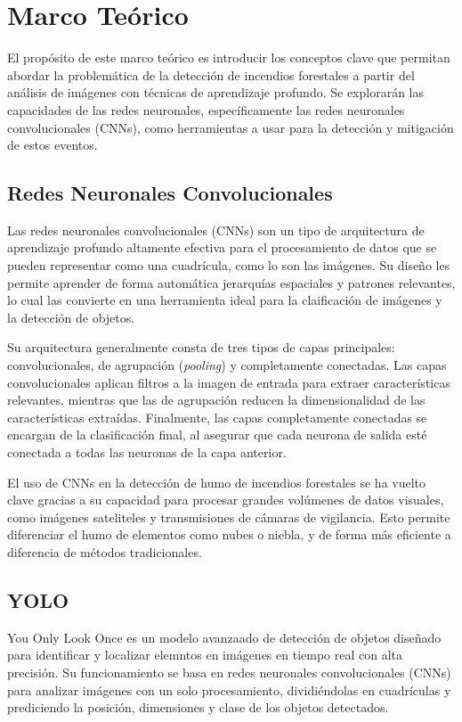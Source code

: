 \section{Marco Teórico}
El propósito de este marco teórico es introducir los conceptos clave que permitan abordar
la problemática de la detección de incendios forestales a partir del análisis de imágenes
con técnicas de aprendizaje profundo. Se explorarán las capacidades de las redes neuronales,
específicamente las redes neuronales convolucionales (CNNs), como herramientas a usar
para la detección y mitigación de estos eventos.

\subsection{Redes Neuronales Convolucionales}
Las redes neuronales convolucionales (CNNs) son un tipo de arquitectura de aprendizaje
profundo altamente efectiva para el procesamiento de datos que se pueden representar
como una cuadrícula, como lo son las imágenes. Su diseño les permite aprender de forma
automática jerarquías espaciales y patrones relevantes, lo cual las convierte en una
herramienta ideal para la claificación de imágenes y la detección de objetos.

Su arquitectura generalmente consta de tres tipos de capas principales: convolucionales,
de agrupación (\textit{pooling}) y completamente conectadas. Las capas convolucionales
aplican filtros a la imagen de entrada para extraer características relevantes, mientras
que las de agrupación reducen la dimensionalidad de las características extraídas.
Finalmente, las capas completamente conectadas se encargan de la clasificación final,
al asegurar que cada neurona de salida esté conectada a todas las neuronas de la capa
anterior.

El uso de CNNs en la detección de humo de incendios forestales se ha vuelto clave gracias
a su capacidad para procesar grandes volúmenes de datos visuales, como imágenes sateliteles
y transmisiones de cámaras de vigilancia. Esto permite diferenciar el humo de elementos
como nubes o niebla, y de forma más eficiente a diferencia de métodos tradicionales.

\subsection{YOLO}
You Only Look Once es un modelo avanzaado de detección de objetos diseñado para identificar
y localizar elemntos en imágenes en tiempo real con alta precisión. Su funcionamiento se
basa en redes neuronales convolucionales (CNNs) para analizar imágenes con un solo
procesamiento, dividiéndolas en cuadrículas y prediciendo la posición, dimensiones y
clase de los objetos detectados.

